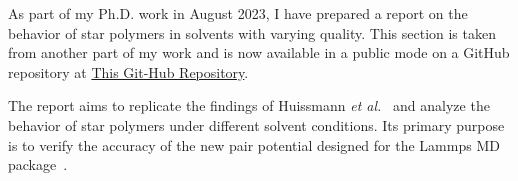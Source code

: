 As part of my Ph.D. work in August 2023, I have prepared a report on the behavior of star polymers in solvents with varying quality. This section is taken from another part of my work and is now available in a public mode on a GitHub repository at \href{https://github.com/ReyhanehFarimani/LJLJ_potential.git}{This Git-Hub Repository}.

The report aims to replicate the findings of Huissmann \textit{et al.}~\cite{Huissmann2009} and analyze the behavior of star polymers under different solvent conditions. Its primary purpose is to verify the accuracy of the new pair potential designed for the Lammps MD package~\cite{LAMMPS}.